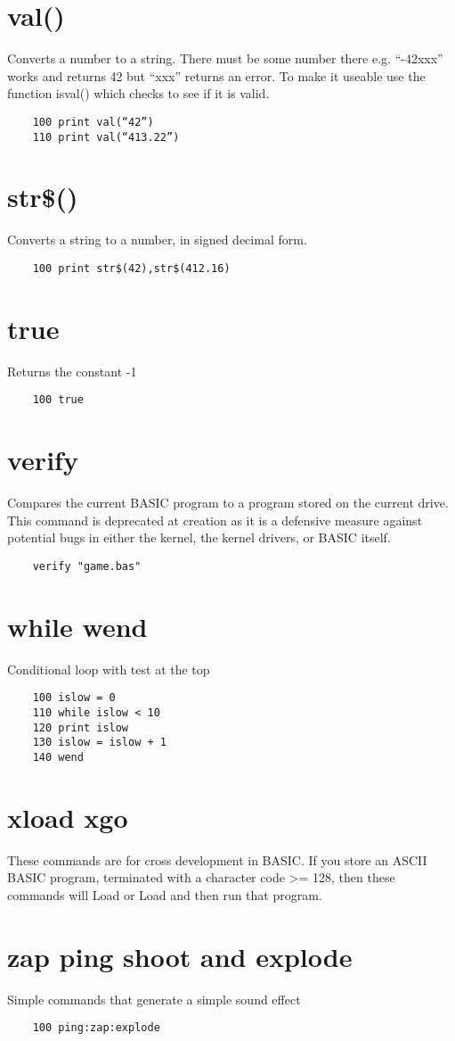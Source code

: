 \section*{val()}
Converts a number to a string. There must be some number there e.g. “-42xxx” works and returns 42 but “xxx” returns an error.  To make it useable use the function isval() which checks to see if it is valid.
\example{}
\begin{verbatim}
	100 print val(“42”)
	110 print val(“413.22”)
\end{verbatim}

\section*{str\$()}
Converts a string to a number, in signed decimal form. 
\example{}
\begin{verbatim}
	100 print str$(42),str$(412.16)
\end{verbatim}

\section*{true}
Returns the constant -1
\example{}
\begin{verbatim}
	100 true
\end{verbatim}

\section*{verify}
Compares the current BASIC program to a program stored on the current drive. This command is deprecated at creation as it is a defensive measure against potential bugs in either the kernel, the kernel drivers, or BASIC itself.
\example{}
\begin{verbatim}
	verify "game.bas"
\end{verbatim}

\section*{while wend}
Conditional loop with test at the top
\example{}
\begin{verbatim}
	100 islow = 0
	110 while islow < 10
	120 print islow
	130 islow = islow + 1
	140 wend
\end{verbatim}

\section*{xload xgo}
These commands are for cross development in BASIC. If you store an ASCII BASIC program, terminated with a character code >= 128, then these commands will Load or Load and then run that program.

\section*{zap ping shoot and explode}
Simple commands that generate a simple sound effect
\example{}
\begin{verbatim}
	100 ping:zap:explode
\end{verbatim}

